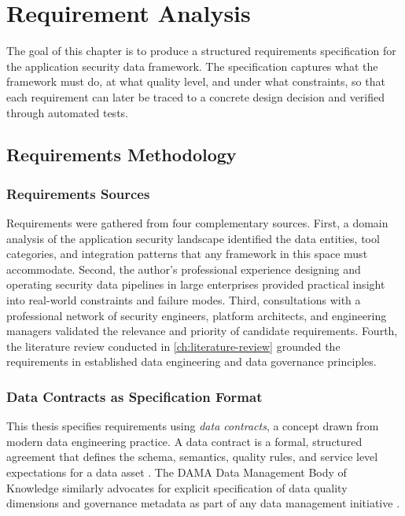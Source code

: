 \chapter{Requirement Analysis}
\label{ch:requirement-analysis}

The goal of this chapter is to produce a structured requirements specification for the application security data framework. The specification captures what the framework must do, at what quality level, and under what constraints, so that each requirement can later be traced to a concrete design decision and verified through automated tests.


\section{Requirements Methodology}
\label{sec:methodology}

\subsection{Requirements Sources}

Requirements were gathered from four complementary sources. First, a domain analysis of the application security landscape identified the data entities, tool categories, and integration patterns that any framework in this space must accommodate. Second, the author's professional experience designing and operating security data pipelines in large enterprises provided practical insight into real-world constraints and failure modes. Third, consultations with a professional network of security engineers, platform architects, and engineering managers validated the relevance and priority of candidate requirements. Fourth, the literature review conducted in \autoref{ch:literature-review} grounded the requirements in established data engineering and data governance principles.

\subsection{Data Contracts as Specification Format}
\label{sec:data-contracts}

This thesis specifies requirements using \emph{data contracts}, a concept drawn from modern data engineering practice. A data contract is a formal, structured agreement that defines the schema, semantics, quality rules, and service level expectations for a data asset \cite{Jones2023}. The DAMA Data Management Body of Knowledge similarly advocates for explicit specification of data quality dimensions and governance metadata as part of any data management initiative \cite{DAMA2017}.

